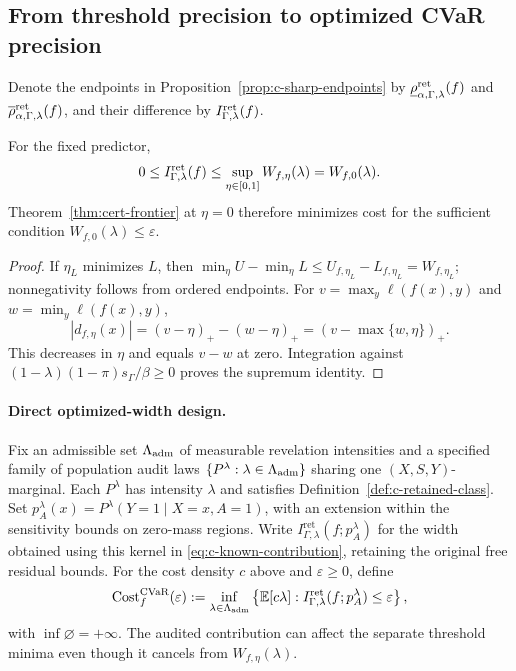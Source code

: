 \subsection{From threshold precision to optimized CVaR precision}
\label{app:optimized-width}
Denote the endpoints in Proposition~\ref{prop:c-sharp-endpoints} by
$\underline\rho^{\rm ret}_{\alpha,\Gamma,\lambda}(f)$ and
$\overline\rho^{\rm ret}_{\alpha,\Gamma,\lambda}(f)$, and their difference by
$I^{\rm ret}_{\Gamma,\lambda}(f)$.
\begin{proposition}\label{prop:c-optimized-width}
For the fixed predictor,
\begin{equation}
 0\leq I^{\rm ret}_{\Gamma,\lambda}(f)
 \leq\sup_{\eta\in[0,1]}W_{f,\eta}(\lambda)=W_{f,0}(\lambda).
 \label{eq:c-optimized-width}
\end{equation}
Theorem~\ref{thm:cert-frontier} at $\eta=0$ therefore minimizes cost for the
sufficient condition $W_{f,0}(\lambda)\leq\varepsilon$.
\end{proposition}
\begin{proof}
If $\eta_L$ minimizes $L$, then
$\min_\eta U-\min_\eta L\leq U_{f,\eta_L}-L_{f,\eta_L}=W_{f,\eta_L}$;
nonnegativity follows from ordered endpoints. For
$v=\max_y\ell(f(x),y)$ and $w=\min_y\ell(f(x),y)$,
\[
 |d_{f,\eta}(x)|=(v-\eta)_+-(w-\eta)_+=(v-\max\{w,\eta\})_+.
\]
This decreases in $\eta$ and equals $v-w$ at zero. Integration against
$(1-\lambda)(1-\pi)s_\Gamma/\beta\geq0$ proves the supremum identity.
\end{proof}

\paragraph{Direct optimized-width design.}
Fix an admissible set $\Lambda_{\rm adm}$ of measurable revelation intensities and
a specified family of population audit laws
$\{P^\lambda:\lambda\in\Lambda_{\rm adm}\}$ sharing one $(X,S,Y)$-marginal.
Each $P^\lambda$ has intensity $\lambda$ and satisfies
Definition~\ref{def:c-retained-class}. Set
$p_A^\lambda(x)=P^\lambda(Y=1\mid X=x,A=1)$, with an extension within the
sensitivity bounds on zero-mass regions.
Write $I^{\mathrm{ret}}_{\Gamma,\lambda}(f;p_A^\lambda)$ for the width obtained
using this kernel in \eqref{eq:c-known-contribution}, retaining the original
free residual bounds. For the cost density $c$ above and $\varepsilon\geq0$, define
\begin{equation}
 \operatorname{Cost}^{\mathrm{CVaR}}_f(\varepsilon)
 :=\inf_{\lambda\in\Lambda_{\rm adm}}
 \left\{\mathbb E[c\lambda]:
 I^{\mathrm{ret}}_{\Gamma,\lambda}(f;p_A^\lambda)\leq\varepsilon\right\},
 \label{eq:c-direct-optimized-cost}
\end{equation}
with $\inf\varnothing=+\infty$. The audited contribution can affect the separate
threshold minima even though it cancels from $W_{f,\eta}(\lambda)$.

